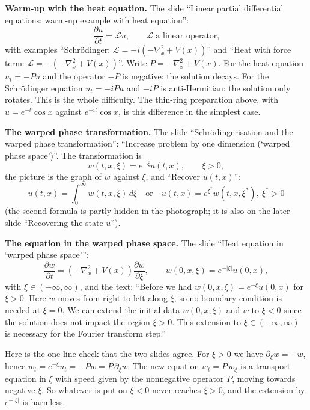 \medskip\noindent
{\bf Warm-up with the heat equation.}
The slide ``Linear partial differential
equations: warm-up example with heat
equation'':
$$
\frac{\partial u}{\partial t}=\mathcal{L}u,
\qquad
\mathcal{L}\text{ a linear operator,}
$$
with examples ``Schr\"odinger:
$\mathcal{L}=-i(-\nabla_x^2+V(x))$'' and
``Heat with force term:
$\mathcal{L}=-(-\nabla_x^2+V(x))$''. Write
$P=-\nabla_x^2+V(x)$. For the heat equation
$u_t=-Pu$ and the operator $-P$ is
negative: the solution decays. For the
Schr\"odinger equation $u_t=-iPu$ and
$-iP$ is anti-Hermitian: the solution only
rotates. This is the whole difficulty. The
thin-ring preparation above, with
$u=e^{-t}\cos x$ against $e^{-it}\cos x$,
is this difference in the simplest case.

\medskip\noindent
{\bf The warped phase transformation.}
The slide ``Schr\"odingerisation and the
warped phase transformation'': ``Increase
problem by one dimension (`warped phase
space')''. The transformation is
$$
w(t,x,\xi)=e^{-\xi}u(t,x),
\qquad
\xi>0,
$$
the picture is the graph of $w$ against
$\xi$, and ``Recover $u(t,x)$'':
$$
u(t,x)=\int_0^\infty w(t,x,\xi)\,d\xi
\quad\text{or}\quad
u(t,x)=e^{\xi^*}w(t,x,\xi^*),
\ \xi^*>0
$$
(the second formula is partly hidden in the
photograph; it is also on the later slide
``Recovering the state $u$'').

\medskip\noindent
{\bf The equation in the warped phase space.}
The slide ``Heat equation in `warped phase
space''':
$$
\frac{\partial w}{\partial t}
=(-\nabla_x^2+V(x))\frac{\partial w}
{\partial\xi},
\qquad
w(0,x,\xi)=e^{-|\xi|}u(0,x),
$$
with $\xi\in(-\infty,\infty)$, and the text:
``Before we had $w(0,x,\xi)=e^{-\xi}u(0,x)$
for $\xi>0$. Here $w$ moves from right to
left along $\xi$, so no boundary condition
is needed at $\xi=0$. We can extend the
initial data $w(0,x,\xi)$ and $w$ to
$\xi<0$ since the solution does not impact
the region $\xi>0$. This extension to
$\xi\in(-\infty,\infty)$ is necessary for the
Fourier transform step.''

\begin{remark}
\label{remark-liu-warped-check}
Here is the one-line check that the two
slides agree. For $\xi>0$ we have
$\partial_\xi w=-w$, hence
$w_t=e^{-\xi}u_t=-Pw=P\,\partial_\xi w$. The
new equation $w_t=P\,w_\xi$ is a transport
equation in $\xi$ with speed given by the
nonnegative operator $P$, moving towards
negative $\xi$. So whatever is put on
$\xi<0$ never reaches $\xi>0$, and the
extension by $e^{-|\xi|}$ is harmless.
\end{remark}

